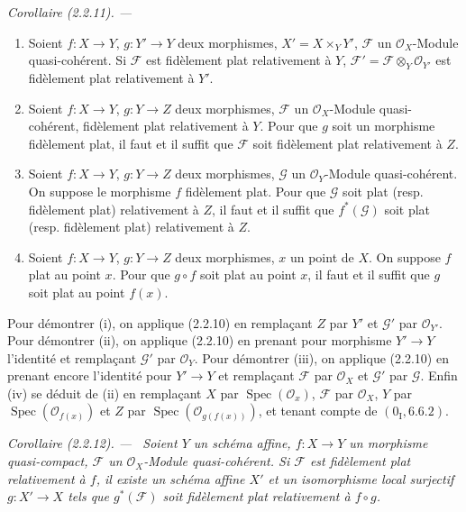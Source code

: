 \documentclass[10pt,oneside]{book}
\newenvironment{corollary}[1][]{%
  \par\medskip\noindent\itshape Corollaire (#1). ---\ }{\par}
\begin{document}
\begin{corollary}[2.2.11]
\label{IV.2.2.11-fr}
\begin{enumerate}
\item[(i)] Soient $f:X\to Y$, $g:Y'\to Y$ deux morphismes,
$X'=X\times_Y Y'$, $\mathscr F$ un $\mathcal O_X$-Module quasi-cohérent. Si
$\mathscr F$ est fidèlement plat relativement à $Y$,
$\mathscr F'=\mathscr F\otimes_Y\mathcal O_{Y'}$ est fidèlement plat
relativement à $Y'$.
\item[(ii)] Soient $f:X\to Y$, $g:Y\to Z$ deux morphismes, $\mathscr F$ un
$\mathcal O_X$-Module quasi-cohérent, fidèlement plat relativement à $Y$.
Pour que $g$ soit un morphisme fidèlement plat, il faut et il suffit que
$\mathscr F$ soit fidèlement plat relativement à $Z$.
\item[(iii)] Soient $f:X\to Y$, $g:Y\to Z$ deux morphismes, $\mathscr G$ un
$\mathcal O_Y$-Module quasi-cohérent. On suppose le morphisme $f$ fidèlement
plat. Pour que $\mathscr G$ soit plat (resp. fidèlement plat) relativement à
$Z$, il faut et il suffit que $f^*(\mathscr G)$ soit plat (resp. fidèlement
plat) relativement à $Z$.
\item[(iv)] Soient $f:X\to Y$, $g:Y\to Z$ deux morphismes, $x$ un point de
$X$. On suppose $f$ plat au point $x$. Pour que $g\circ f$ soit plat au point
$x$, il faut et il suffit que $g$ soit plat au point $f(x)$.
\end{enumerate}
\end{corollary}

Pour démontrer (i), on applique (2.2.10) en remplaçant $Z$ par $Y'$ et
$\mathscr G'$ par $\mathcal O_{Y'}$. Pour démontrer (ii), on applique
(2.2.10) en prenant pour morphisme $Y'\to Y$ l'identité et remplaçant
$\mathscr G'$ par $\mathcal O_Y$. Pour démontrer (iii), on applique (2.2.10)
en prenant encore l'identité pour $Y'\to Y$ et remplaçant $\mathscr F$ par
$\mathcal O_X$ et $\mathscr G'$ par $\mathscr G$. Enfin (iv) se déduit de
(ii) en remplaçant $X$ par $\operatorname{Spec}(\mathcal O_x)$,
$\mathscr F$ par $\mathcal O_X$, $Y$ par
$\operatorname{Spec}(\mathcal O_{f(x)})$ et $Z$ par
$\operatorname{Spec}(\mathcal O_{g(f(x))})$, et tenant compte de
$(0_{\mathrm I},6.6.2)$.

\begin{corollary}[2.2.12]
\label{IV.2.2.12-fr}
Soient $Y$ un schéma affine, $f:X\to Y$ un morphisme quasi-compact,
$\mathscr F$ un $\mathcal O_X$-Module quasi-cohérent. Si $\mathscr F$ est
fidèlement plat relativement à $f$, il existe un schéma affine $X'$ et un
isomorphisme local surjectif $g:X'\to X$ tels que $g^*(\mathscr F)$ soit
fidèlement plat relativement à $f\circ g$.
\end{corollary}
\end{document}

